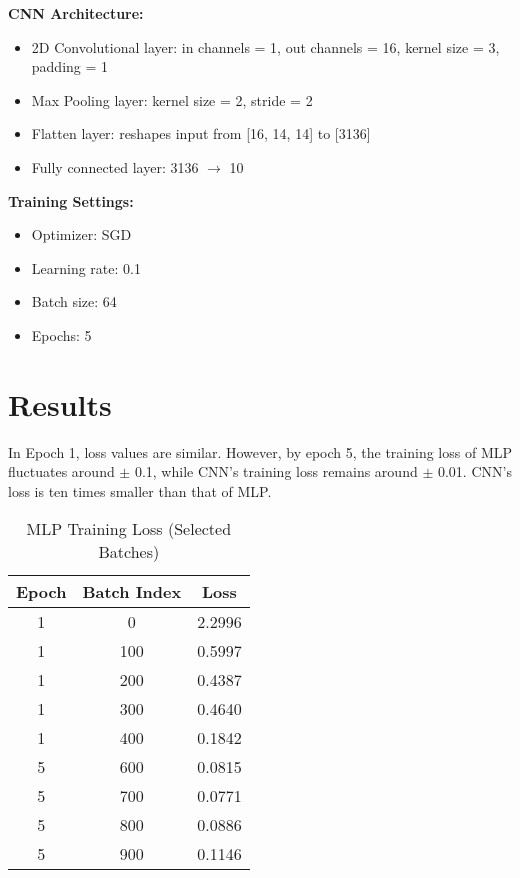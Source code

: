 \documentclass[conference]{IEEEtran}
\begin{document}
\textbf{CNN Architecture:}
\begin{itemize}
  \item 2D Convolutional layer: in channels = 1, out channels = 16, kernel size = 3, padding = 1
  \item Max Pooling layer: kernel size = 2, stride = 2
  \item Flatten layer: reshapes input from [16, 14, 14] to [3136]
  \item Fully connected layer: 3136 $\rightarrow$ 10
\end{itemize}

\textbf{Training Settings:}
\begin{itemize}
  \item Optimizer: SGD
  \item Learning rate: 0.1
  \item Batch size: 64
  \item Epochs: 5
\end{itemize}

\section{Results}

In Epoch 1, loss values are similar. However, by epoch 5, the training loss of MLP fluctuates around $\pm$ 0.1, while CNN’s training loss remains around $\pm$ 0.01. CNN’s loss is ten times smaller than that of MLP.

\begin{table}[htbp]
\caption{MLP Training Loss (Selected Batches)}
\begin{center}
\begin{tabular}{|c|c|c|}
\hline
\textbf{Epoch} & \textbf{Batch Index} & \textbf{Loss} \\
\hline
1 & 0   & 2.2996 \\
1 & 100 & 0.5997 \\
1 & 200 & 0.4387 \\
1 & 300 & 0.4640 \\
1 & 400 & 0.1842 \\
\hline
5 & 600 & 0.0815 \\
5 & 700 & 0.0771 \\
5 & 800 & 0.0886 \\
5 & 900 & 0.1146 \\
\hline
\end{tabular}
\label{tab:training_loss}
\end{center}
\end{table}
\end{document}
